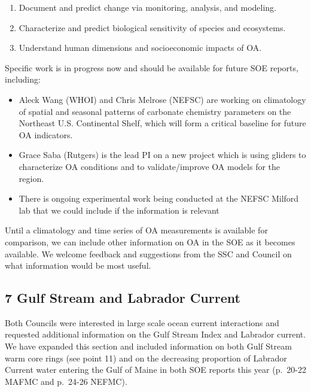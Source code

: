\documentclass[
  10pt,
]{article}
\providecommand{\tightlist}{%
  \setlength{\itemsep}{0pt}\setlength{\parskip}{0pt}}
\begin{document}
\begin{enumerate}
\def\labelenumi{\arabic{enumi}.}
\tightlist
\item
  Document and predict change via monitoring, analysis, and modeling.\\
\item
  Characterize and predict biological sensitivity of species and
  ecosystems.\\
\item
  Understand human dimensions and socioeconomic impacts of OA.
\end{enumerate}

Specific work is in progress now and should be available for future SOE
reports, including:

\begin{itemize}
\tightlist
\item
  Aleck Wang (WHOI) and Chris Melrose (NEFSC) are working on climatology
  of spatial and seasonal patterns of carbonate chemistry parameters on
  the Northeast U.S. Continental Shelf, which will form a critical
  baseline for future OA indicators.
\item
  Grace Saba (Rutgers) is the lead PI on a new project which is using
  gliders to characterize OA conditions and to validate/improve OA
  models for the region.
\item
  There is ongoing experimental work being conducted at the NEFSC
  Milford lab that we could include if the information is relevant
\end{itemize}

Until a climatology and time series of OA measurements is available for
comparison, we can include other information on OA in the SOE as it
becomes available. We welcome feedback and suggestions from the SSC and
Council on what information would be most useful.

\hypertarget{gulf-stream-and-labrador-current}{%
\subsection{7 Gulf Stream and Labrador
Current}\label{gulf-stream-and-labrador-current}}

Both Councils were interested in large scale ocean current interactions
and requested additional information on the Gulf Stream Index and
Labrador current. We have expanded this section and included information
on both Gulf Stream warm core rings (see point 11) and on the decreasing
proportion of Labrador Current water entering the Gulf of Maine in both
SOE reports this year (p.~20-22 MAFMC and p.~24-26 NEFMC).
\end{document}
